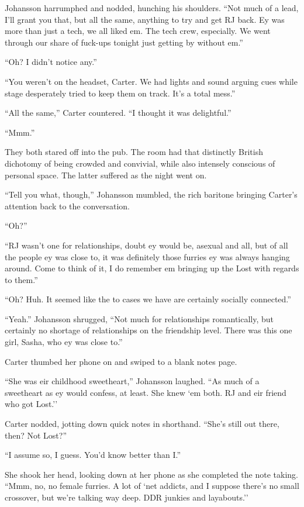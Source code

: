 Johansson harrumphed and nodded, hunching his shoulders.  ``Not much of a lead, I'll grant you that, but all the same, anything to try and get RJ back.  Ey was more than just a tech, we all liked em.  The tech crew, especially.  We went through our share of fuck-ups tonight just getting by without em.''

``Oh?  I didn't notice any.''

``You weren't on the headset, Carter.  We had lights and sound arguing cues while stage desperately tried to keep them on track.  It's a total mess.''

``All the same,'' Carter countered.  ``I thought it was delightful.''

``Mmm.''

They both stared off into the pub.  The room had that distinctly British dichotomy of being crowded and convivial, while also intensely conscious of personal space.  The latter suffered as the night went on.

``Tell you what, though,'' Johansson mumbled, the rich baritone bringing Carter's attention back to the conversation.

``Oh?''

``RJ wasn't one for relationships, doubt ey would be, asexual and all, but of all the people ey was close to, it was definitely those furries ey was always hanging around.  Come to think of it, I do remember em bringing up the Lost with regards to them.''

``Oh?  Huh.  It seemed like the to cases we have are certainly socially connected.''

``Yeah.''  Johansson shrugged, ``Not much for relationships romantically, but certainly no shortage of relationships on the friendship level.  There was this one girl, Sasha, who ey was close to.''

Carter thumbed her phone on and swiped to a blank notes page.

``She was eir childhood sweetheart,'' Johansson laughed.  ``As much of a sweetheart as ey would confess, at least.  She knew `em both.  RJ and eir friend who got Lost.''

Carter nodded, jotting down quick notes in shorthand.  ``She's still out there, then?  Not Lost?''

``I assume so, I guess.  You'd know better than I.''

She shook her head, looking down at her phone as she completed the note taking.  ``Mmm, no, no female furries.  A lot of `net addicts, and I suppose there's no small crossover, but we're talking way deep.  DDR junkies and layabouts.''


